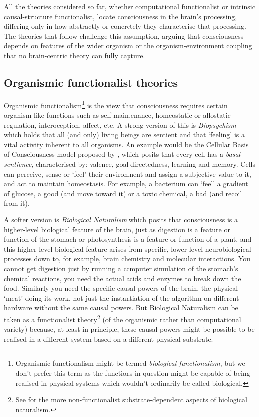 \documentclass[11pt, a4paper, onecolumn, gdm]{google}
\begin{document}
All the theories considered so far, whether computational functionalist or intrinsic causal-structure functionalist, locate consciousness in the brain's processing, differing only in how abstractly or concretely they characterise that processing.
The theories that follow challenge this assumption, arguing that consciousness depends on features of the wider organism or the organism-environment coupling that no brain-centric theory can fully capture.

\subsection{Organismic functionalist theories}\label{organismic-functionalist-theories}

Organismic functionalism\footnote{Organismic functionalism might be termed \emph{biological functionalism}, but we don't prefer this term as the functions in question might be capable of being realised in physical systems which wouldn't ordinarily be called biological.} is the view that consciousness requires certain organism-like functions such as self-maintenance, homeostatic or allostatic regulation, interoception, affect, etc. A strong version of this is \emph{Biopsychism} which holds that all (and only) living beings are sentient and that `feeling' is a vital activity inherent to all organisms.
An example would be the Cellular Basis of Consciousness model proposed by \citet{reber2023}, which posits that every cell has a \emph{basal sentience}, characterised by: valence, goal-directedness, learning and memory.
Cells can perceive, sense or `feel' their environment and assign a subjective value to it, and act to maintain homeostasis.
For example, a bacterium can `feel' a gradient of glucose, a good (and move toward it) or a toxic chemical, a bad (and recoil from it).

A softer version is \emph{Biological Naturalism} \citep{searle2017} which posits that consciousness is a higher-level biological feature of the brain, just as digestion is a feature or function of the stomach or photosynthesis is a feature or function of a plant, and this higher-level biological feature arises from specific, lower-level neurobiological processes down to, for example, brain chemistry and molecular interactions.
You cannot get digestion just by running a computer simulation of the stomach's chemical reactions, you need the actual acids and enzymes to break down the food.
Similarly you need the specific causal powers of the brain, the physical `meat' doing its work, not just the instantiation of the algorithm on different hardware without the same causal powers.
But Biological Naturalism can be taken as a functionalist theory\footnote{See  for the more non-functionalist substrate-dependent aspects of biological naturalism.} (of the organismic rather than computational variety) because, at least in principle, these causal powers might be possible to be realised in a different system based on a different physical substrate.
\end{document}
